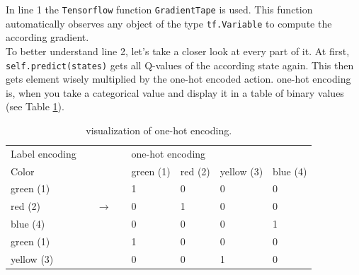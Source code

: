 \documentclass[12pt]{article}
\begin{document}
In line 1 the \lstinline{Tensorflow} function \lstinline{GradientTape} is used. This function automatically observes any object of the type \lstinline{tf.Variable} to compute the according \gls{gradient}. \cite{tf.grad} \\To better understand line 2, let's take a closer look at every part of it. At first, \lstinline{self.predict(states)} gets all \glspl{Q-value} of the according \gls{state} again. This then gets element wisely multiplied by the one-hot encoded action. \Gls{one-hot encoding} is, when you take a categorical value and display it in a table of binary values (see Table \ref{tab:oneHot}). 

\begin{centering}
\begin{table}[h]
\caption{visualization of \gls{one-hot encoding}.}
\label{tab:oneHot}
\begin{tabular}{lllllllll}
Label encoding               &  &  &  &                       & \multicolumn{4}{l}{one-hot encoding}                                                              \\ \cline{1-1} \cline{6-9} 
\multicolumn{1}{|l|}{Color} &
   &
   &
   &
  \multicolumn{1}{l|}{} &
  \multicolumn{1}{l|}{green (1)} &
  \multicolumn{1}{l|}{red (2)} &
  \multicolumn{1}{l|}{yellow (3)} &
  \multicolumn{1}{l|}{blue (4)} \\ \cline{1-1} \cline{6-9} 
\multicolumn{1}{|l|}{green (1)}  &  &  &  & \multicolumn{1}{l|}{} & \multicolumn{1}{l|}{1} & \multicolumn{1}{l|}{0} & \multicolumn{1}{l|}{0} & \multicolumn{1}{l|}{0} \\ \cline{1-1} \cline{6-9} 
\multicolumn{1}{|l|}{red (2)} &
   &
  \multicolumn{2}{l}{$\rightarrow$} &
  \multicolumn{1}{l|}{} &
  \multicolumn{1}{l|}{0} &
  \multicolumn{1}{l|}{1} &
  \multicolumn{1}{l|}{0} &
  \multicolumn{1}{l|}{0} \\ \cline{1-1} \cline{6-9} 
\multicolumn{1}{|l|}{blue (4)}   &  &  &  & \multicolumn{1}{l|}{} & \multicolumn{1}{l|}{0} & \multicolumn{1}{l|}{0} & \multicolumn{1}{l|}{0} & \multicolumn{1}{l|}{1} \\ \cline{1-1} \cline{6-9} 
\multicolumn{1}{|l|}{green (1)}  &  &  &  & \multicolumn{1}{l|}{} & \multicolumn{1}{l|}{1} & \multicolumn{1}{l|}{0} & \multicolumn{1}{l|}{0} & \multicolumn{1}{l|}{0} \\ \cline{1-1} \cline{6-9} 
\multicolumn{1}{|l|}{yellow (3)} &  &  &  & \multicolumn{1}{l|}{} & \multicolumn{1}{l|}{0} & \multicolumn{1}{l|}{0}  & \multicolumn{1}{l|}{1} & \multicolumn{1}{l|}{0} \\ \cline{1-1} \cline{6-9} 
\end{tabular}
\end{table}
\end{centering}
\end{document}

